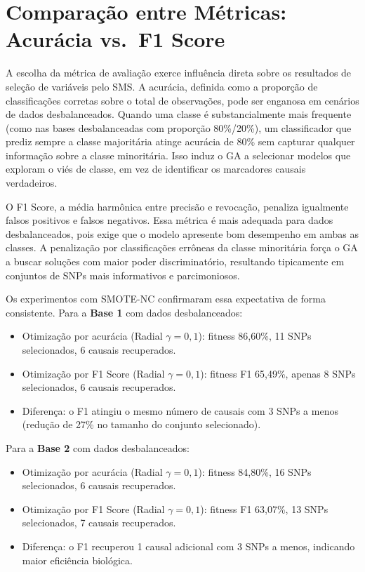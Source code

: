 \documentclass[12pt,a4paper]{article}
\newcommand{\novo}[1]{\textcolor{corNova}{#1}}
\begin{document}
\section{\novo{Comparação entre Métricas: Acurácia vs.\ F1 Score}}

\novo{A escolha da métrica de avaliação exerce influência direta sobre os resultados de seleção de variáveis pelo SMS. A acurácia, definida como a proporção de classificações corretas sobre o total de observações, pode ser enganosa em cenários de dados desbalanceados. Quando uma classe é substancialmente mais frequente (como nas bases desbalanceadas com proporção 80\%/20\%), um classificador que prediz sempre a classe majoritária atinge acurácia de 80\% sem capturar qualquer informação sobre a classe minoritária. Isso induz o GA a selecionar modelos que exploram o viés de classe, em vez de identificar os marcadores causais verdadeiros.}

\novo{O F1 Score, a média harmônica entre precisão e revocação, penaliza igualmente falsos positivos e falsos negativos. Essa métrica é mais adequada para dados desbalanceados, pois exige que o modelo apresente bom desempenho em ambas as classes. A penalização por classificações errôneas da classe minoritária força o GA a buscar soluções com maior poder discriminatório, resultando tipicamente em conjuntos de SNPs mais informativos e parcimoniosos.}

\novo{Os experimentos com SMOTE-NC confirmaram essa expectativa de forma consistente. Para a \textbf{Base 1} com dados desbalanceados:}
\begin{itemize}
  \item \novo{Otimização por acurácia (Radial $\gamma = 0{,}1$): fitness 86,60\%, 11 SNPs selecionados, 6 causais recuperados.}
  \item \novo{Otimização por F1 Score (Radial $\gamma = 0{,}1$): fitness F1 65,49\%, apenas 8 SNPs selecionados, 6 causais recuperados.}
  \item \novo{Diferença: o F1 atingiu o mesmo número de causais com 3 SNPs a menos (redução de 27\% no tamanho do conjunto selecionado).}
\end{itemize}

\novo{Para a \textbf{Base 2} com dados desbalanceados:}
\begin{itemize}
  \item \novo{Otimização por acurácia (Radial $\gamma = 0{,}1$): fitness 84,80\%, 16 SNPs selecionados, 6 causais recuperados.}
  \item \novo{Otimização por F1 Score (Radial $\gamma = 0{,}1$): fitness F1 63,07\%, 13 SNPs selecionados, 7 causais recuperados.}
  \item \novo{Diferença: o F1 recuperou 1 causal adicional com 3 SNPs a menos, indicando maior eficiência biológica.}
\end{itemize}
\end{document}
